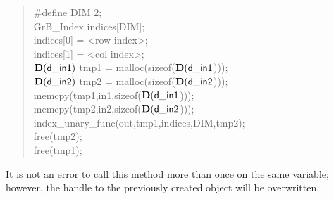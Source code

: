 \begin{quote}
\begin{code}
    \#define DIM 2;\\
    GrB\_Index indices[DIM];\\
    indices[0] = <row index>;\\
    indices[1] = <col index>;\\
    $\mathbf{D}({\sf d\_in1})$ tmp1 = malloc(sizeof($\mathbf{D}({\sf d\_in1}$))); \\
    $\mathbf{D}({\sf d\_in2})$ tmp2 = malloc(sizeof($\mathbf{D}({\sf d\_in2}$))); \\
    memcpy(tmp1,in1,sizeof($\mathbf{D}({\sf d\_in1}$))); \\
    memcpy(tmp2,in2,sizeof($\mathbf{D}({\sf d\_in2}$))); \\
    index\_unary\_func(out,tmp1,indices,DIM,tmp2); \\
    free(tmp2); \\
    free(tmp1);
\end{code}
\end{quote}

It is not an error to call this method more than once on the same variable;  
however, the handle to the previously created object will be overwritten. 
